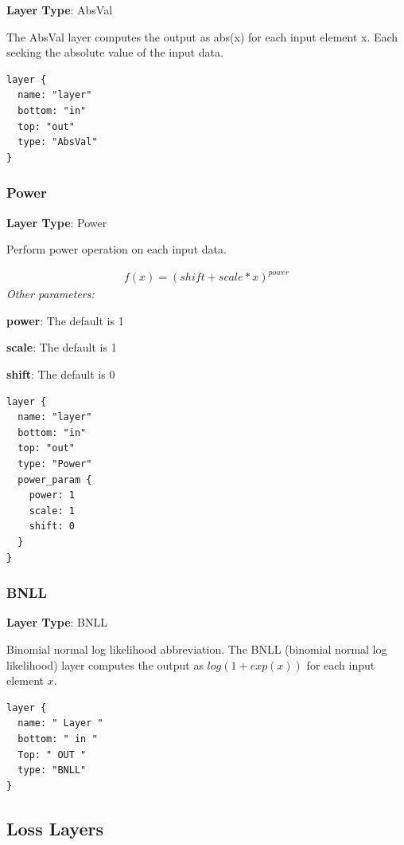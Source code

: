 \documentclass[12pt]{article}
\begin{document}
\noindent \textbf{Layer Type}: AbsVal

The AbsVal layer computes the output as abs(x) for each input element x. Each seeking the absolute value of the input data.

\begin{lstlisting}[style=json, frame=single]
layer {
  name: "layer"
  bottom: "in"
  top: "out"
  type: "AbsVal"
}
\end{lstlisting}

\subsubsection{Power}

\noindent \textbf{Layer Type}: Power

Perform power operation on each input data.

\begin{gather}
f (x) = (shift + scale * x) ^ {power}
\end{gather}
\emph{Other parameters:}

\noindent \textbf{power}: The default is 1

\noindent \textbf{scale}: The default is 1

\noindent \textbf{shift}: The default is 0

\begin{lstlisting}[style=json, frame=single]
layer {
  name: "layer"
  bottom: "in"
  top: "out"
  type: "Power"
  power_param {
    power: 1
    scale: 1
    shift: 0
  }
}
\end{lstlisting}

\subsubsection{BNLL}

\noindent \textbf{Layer Type}: BNLL

Binomial normal log likelihood abbreviation. The BNLL (binomial normal log likelihood) layer computes the output as $log(1 + exp(x))$ for each input element $x$.

\begin{lstlisting}[style=json, frame=single]
layer {
  name: " Layer "
  bottom: " in "
  Top: " OUT "
  type: "BNLL"
}
\end{lstlisting}

\newpage

\subsection{Loss Layers}
\end{document}
